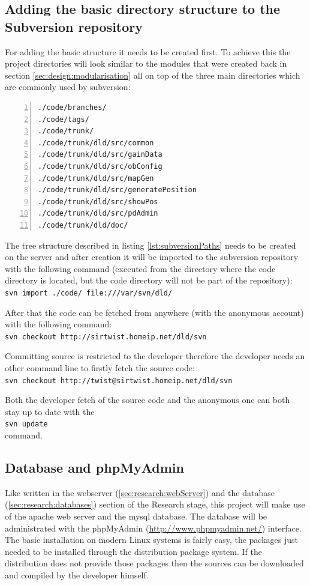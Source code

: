   \subsection{Adding the basic directory structure to the Subversion repository}
   For adding the basic structure it needs to be created first. To achieve this the project directories will look similar to the modules that were created back in section \ref{sec:design:modularisation} all on top of the three main directories which are commonly used by subversion:
   \begin{lstlisting}[frame=single,breaklines,basicstyle=\footnotesize,numbers=left,label=lst:subversionPaths,captionpos=b,caption={Tree structure of the project in the repository}]
./code/branches/
./code/tags/
./code/trunk/
./code/trunk/dld/src/common
./code/trunk/dld/src/gainData
./code/trunk/dld/src/obConfig
./code/trunk/dld/src/mapGen
./code/trunk/dld/src/generatePosition
./code/trunk/dld/src/showPos
./code/trunk/dld/src/pdAdmin
./code/trunk/dld/doc/
   \end{lstlisting}

   The tree structure described in listing \ref{lst:subversionPaths} needs to be created on the server and after creation it will be imported to the subversion repository with the following command (executed from the directory where the code directory is located, but the code directory will not be part of the repository):\\
   \verb=svn import ./code/ file:///var/svn/dld/=

   After that the code can be fetched from anywhere (with the anonymous account) with the following command:\\
   \verb=svn checkout http://sirtwist.homeip.net/dld/svn=

   Committing source is restricted to the developer therefore the developer needs an other command line to firstly fetch the source code:\\
   \verb=svn checkout http://twist@sirtwist.homeip.net/dld/svn=

   Both the developer fetch of the source code and the anonymous one can both stay up to date with the\\
   \verb=svn update= \\
   command.

  \subsection{Database and phpMyAdmin}
   Like written in the webserver (\ref{sec:research:webServer}) and the database (\ref{sec:research:databases}) section of the Research stage, this project will make use of the apache web server and the mysql database. The database will be administrated with the phpMyAdmin (\url{http://www.phpmyadmin.net/}) interface. The basic installation on modern Linux systems is fairly easy, the packages just needed to be installed through the distribution package system. If the distribution does not provide those packages then the sources can be downloaded and compiled by the developer himself.

